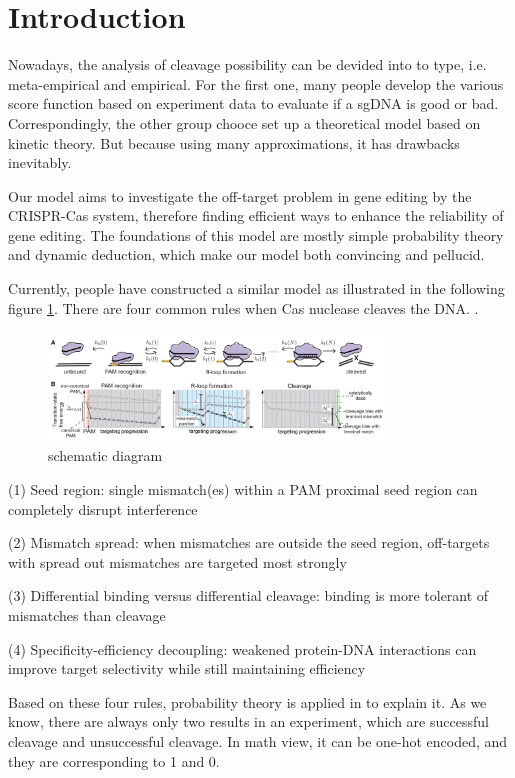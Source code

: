 \section{Introduction}
Nowadays, the analysis of cleavage possibility can be devided into to type, i.e. meta-empirical and empirical. For the first one, many people develop the various score function based on experiment data to evaluate if a sgDNA is good or bad. Correspondingly, the other group chooce set up a theoretical model based on kinetic theory. But because using many approximations, it has drawbacks inevitably. 

Our model aims to investigate the off-target problem in gene editing by the CRISPR-Cas system, therefore finding efficient ways to enhance the reliability of gene editing. The foundations of this model are mostly simple probability theory and dynamic deduction, which make our model both convincing and pellucid.
	
Currently, people have constructed a similar model as illustrated in the following figure \ref{fig:1}. There are four common rules when Cas nuclease cleaves the DNA\cite{klein2018hybridization}.
	.
\begin{figure}[tbph]
\centering
\includegraphics[width=3.5in]{1}
\caption{schematic diagram}
\label{fig:1}
\end{figure}
	
(1) Seed region: single mismatch(es) within a PAM proximal seed region can completely disrupt interference\par
(2) Mismatch spread: when mismatches are outside the seed region, off-targets with spread out mismatches are targeted most strongly\par
(3) Differential binding versus differential cleavage: binding is more tolerant of mismatches than cleavage\par 
(4) Specificity-efficiency decoupling: weakened protein-DNA interactions can improve target selectivity while still maintaining efficiency\par

Based on these four rules, probability theory is applied in to explain it. As we know, there are always only two results in an experiment, which are successful cleavage and unsuccessful cleavage. In math view, it can be one-hot encoded, and they are corresponding to 1 and 0. 

